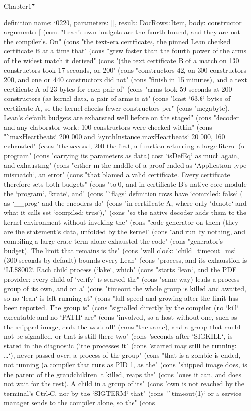 \begin{lexlean}{Chapter17}
\begin{semanticmodule}
definition{
  name: i0220,
  parameters: [],
  result: DocRows::Item,
  body: constructor{
    arguments: [
      (cons "Lean's own budgets are the fourth bound, and they are not the compiler's. On" (cons "the text-era certificates, the pinned Lean checked certificate B at a time that" (cons "grew faster than the fourth power of the arms of the widest match it derived" (cons "(the text certificate B of a match on 130 constructors took 17 seconds, on 200" (cons "constructors 42, on 300 constructors 200, and one on 440 constructors did not" (cons "finish in 15 minutes), and a text certificate A of 23 bytes for each pair of" (cons "arms took 59 seconds at 200 constructors (as kernel data, a pair of arms is at" (cons "least `63.6` bytes of certificate A, so the kernel checks fewer constructors per" (cons "megabyte). Lean's default budgets are exhausted well before on the staged" (cons "decoder and any elaborator work: 100 constructors were checked within" (cons "`maxHeartbeats` 200 000 and `synthInstance.maxHeartbeats` 20 000, 160 exhausted" (cons "the second, 200 the first, a function returning a large literal (a program" (cons "carrying its parameters as data) cost `isDefEq` as much again, and exhausting" (cons "either in the middle of a proof ended as `Application type mismatch`, an error" (cons "that blamed a valid certificate. Every certificate therefore sets both budgets" (cons "to 0, and in certificate B's native core module the `program`, `krate`, and" (cons "`flags` definition rows have `compiled: false` ( as `__prog` and the encoders do" (cons "in certificate A, where only `denote` and what it calls set `compiled: true`)," (cons "so the native decoder adds them to the kernel environment without invoking the" (cons "code generator on them (they are the statement's data, unfolded by the kernel" (cons "and run by nothing, and compiling a large crate term alone exhausted the code" (cons "generator's budget). The limit that remains is the" (cons "wall clock: `child_timeout_ms` (300 seconds by default) bounds every Lean" (cons "process, and its exhaustion is `LLS8002`. Each child process (`lake`, which" (cons "starts `lean`, and the PDF provider: every child of `verify` is started the" (cons "same way) leads a process group of its own, and on a" (cons "timeout the whole group is killed and awaited, so no `lean` is left running at" (cons "full speed and growing after the limit has been reported. The group is" (cons "signalled directly by the compiler (no `kill` executable and no `PATH` are" (cons "involved, so a host without one, such as the shipped image, ends the work all" (cons "the same), and a group that could not be signalled, or that is still there two" (cons "seconds after `SIGKILL`, is stated in the diagnostic (`the processes it" (cons "started may still be running: …`), never passed over; a process of the group" (cons "that is a zombie is ended, not running (a compiler that runs as PID 1, as the" (cons "shipped image does, is the parent of the grandchildren it killed, reaps the" (cons "ones it can, and does not wait for the rest). A child in a group of its" (cons "own is not reached by the terminal's Ctrl-C, nor by the `SIGTERM` that" (cons "`timeout(1)` or a service manager sends to the compiler alone, so the" (cons }}
\end{semanticmodule}
\end{lexlean}
